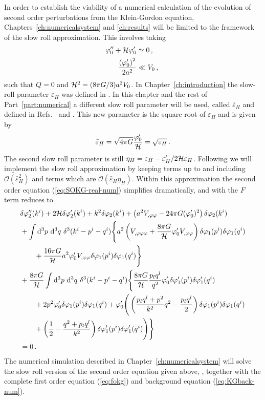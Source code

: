 In order to establish the viability of a numerical calculation of the evolution of
second order perturbations from the
Klein-Gordon equation, Chapters~\ref{ch:numericalsystem} and \ref{ch:results} will be limited to
the framework of the slow roll approximation. 
This involves taking
%
\begin{align}
 \varphi_{0}'' + \mathcal{H} \varphi_{0}' &\simeq 0\,,\quad \\
\frac{\left(\varphi_{0}'\right)^2}{2a^2} &\ll V_{0}\,,
\end{align}
%
such that $Q=0$ and $\mathcal{H}^2 = (8\pi G/3) a^2 V_{0}$. 
In Chapter~\ref{ch:introduction} the slow-roll parameter $\varepsilon_H$ was
defined in . 
In this chapter and the rest of Part~\ref{part:numerical} a different slow 
roll parameter will be used, called
$\bar{\varepsilon}_H$ and defined in Refs.~\cite{Malik:2006ir} and
\cite{Seery:2005gb}. 
This new parameter is the square-root of $\varepsilon_H$ and is given by
%
\begin{equation}
 \bar{\varepsilon}_H = \sqrt{4\pi G} \frac{\varphi_{0}'}{\mathcal{H}} = \sqrt{\varepsilon_H}\,.
\end{equation}
%
The second slow roll parameter is still $\eta_H = \varepsilon_H -
\varepsilon_H'/2\mathcal{H} \varepsilon_H$. Following  we
will implement the slow roll approximation by keeping terms up to and including
$\mathcal{O}(\bar{\varepsilon}^2_H)$ and terms which are
$\mathcal{O}(\bar{\varepsilon}_H \eta_H)$. 
Within this approximation the second order equation (\ref{eq:SOKG-real-num})
simplifies dramatically, and with the $F$ term reduces to
%
\begin{align}
 \label{eq:KG2-fourier-sr-num}
&\dvp2''(\kvi)+2\H\dvp2'(\kvi)+k^2\dvp2(\kvi)
+\left(a^2
\Upp-{24 \pi G}(\vp_{0}')^2\right)
\dvp2(\kvi) \nonumber\\
%
&+ \int \d^3p\ \d^3q\ \delta^3(\kvi-\pvi-\qvi) \Bigg\{
a^2\left(\Uppp
+ \frac{8\pi G}{\H}\vp_{0}' \Upp\right)
 \dvp1(\pvi)\dvp1(\qvi) \nonumber \\
%
&\qquad +\frac{16\pi G}{\H}a^2
\vp_{0}'\Upp\dvp1(\pvi)\dvp1(\qvi)\Bigg\}
\nonumber \\
%
&+ \frac{8\pi G}{\H}
\int \d^3p\ \d^3q\ \delta^3(\kvi-\pvi-\qvi)  \Bigg\{
%
\frac{8\pi G}{\H}\frac{p_l q^l}{q^2}\vp_{0}'\dvp1'(\pvi)
\dvp1'(\qvi) \nonumber\\
% 
&\qquad+ 2p^2\vp_{0}' \dvp1(\pvi) \dvp1(\qvi)
%
+\vp_{0}'
\Bigg(
\left(\frac{p_lq^l+p^2}{k^2}q^2-\frac{p_lq^l}{2}\right)
\dvp1(\pvi)\dvp1(\qvi) \nonumber \\
% 
&\qquad+\left(\frac{1}{2}-\frac{q^2+p_lq^l}{k^2}\right)
\dvp1'(\pvi)\dvp1'(\qvi)\Bigg)
\Bigg\} \nonumber \\
% 
&=0 \,.
\end{align}
%
The numerical simulation described in Chapter~\ref{ch:numericalsystem} will solve the
slow roll version of the second order equation given above,
, together with the complete first
order equation (\ref{eq:fokg}) and background equation
(\ref{eq:KGback-num}). 
% 
% 
% 
% 

